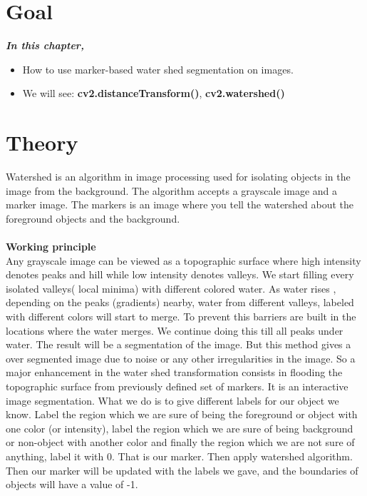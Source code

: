 \documentclass[]{article}
\date{}
\begin{document}
\section{Goal}\label{goal}

\emph{\textbf{In this chapter,}} 
\begin{itemize} 
	\item How to use marker-based water shed segmentation on images.
    \item  We will see: \textbf{cv2.distanceTransform()}, \textbf{cv2.watershed()}
\end{itemize}

\section{Theory}\label{theory}
Watershed is an algorithm in image processing used for isolating objects in the image from the background. The algorithm accepts a grayscale image and a marker image. The markers is an image where you tell the watershed about the foreground objects and the background. \\
\\
\Large{\textbf{Working principle}} \\
Any grayscale image can be viewed as a topographic surface where high intensity denotes peaks and hill while low intensity denotes valleys. We start filling every isolated valleys( local minima) with different colored water. As water rises , depending on the peaks (gradients) nearby, water from different valleys, labeled with different colors will start to merge. To prevent this barriers are built in the locations where the water merges. We continue doing this till all peaks under water. The result will be a segmentation of the image. But this method gives a over segmented image due to noise or any other irregularities in the image. So a major enhancement in the water shed transformation consists in flooding the topographic surface from previously defined set of markers. It is an interactive image segmentation.
What we do is to give different labels for our object we know. Label the region which we are sure of being the foreground or object with one color (or intensity), label the region which we are sure of being background or non-object with another color and finally the region which we are not sure of anything, label it with 0. That is our marker. Then apply watershed algorithm. Then our marker will be updated with the labels we gave, and the boundaries of objects will have a value of -1.
\end{document}
